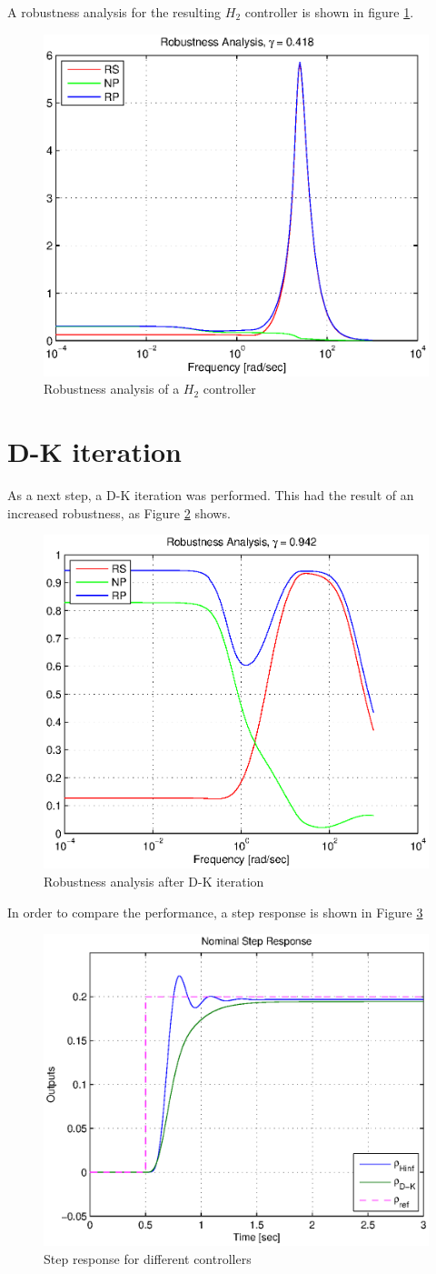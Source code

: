 \documentclass[conference]{IEEEtran}
\begin{document}
A robustness analysis for the resulting $H_2$ controller is shown in figure \ref{figure:RP_before_DK}.

\begin{figure}[h]
\centering
  \includegraphics[width=.47\textwidth]{pics/RP_before_DK} 
  \caption{Robustness analysis of a $H_2$ controller}  
  \label{figure:RP_before_DK}
\end{figure}



\section{D-K iteration}

As a next step, a D-K iteration was performed. This had the result of an increased robustness, as Figure \ref{figure:RP_after_DK} shows.

\begin{figure}[h]
\centering
  \includegraphics[width=.47\textwidth]{pics/RP_after_DK} 
  \caption{Robustness analysis after D-K iteration}  
  \label{figure:RP_after_DK}
\end{figure}

In order to compare the performance, a step response is shown in Figure \ref{figure:step_comp_02}


\begin{figure}[h]
\centering
  \includegraphics[width=.47\textwidth]{pics/step_comp_02} 
  \caption{Step response for different controllers}  
  \label{figure:step_comp_02}
\end{figure}
\end{document}
